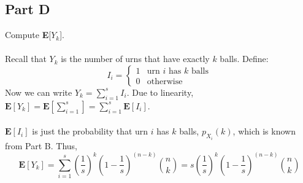\documentclass{amsart}
\begin{document}
	\subsection{Part D}
	Compute \textbf{E}[$Y_k$].\\
	\\
	Recall that $Y_k$ is the number of urns that have exactly $k$ balls. Define:\\
	\[
		I_i=
		\begin{cases}
			1 & \text{urn } i \text{ has } k \text{ balls}\\
			0 & \text{otherwise}
		\end{cases}
	\]
	Now we can write $Y_k = \sum_{i=1}^{s} I_i$. Due to linearity, $\textbf{E}[Y_k] = \textbf{E}\left[\sum_{i=1}^{s}\right] =\sum_{i=1}^{s} \textbf{E}[I_i]$.\\
	\\
	$\textbf{E}[I_i]$ is just the probability that urn $i$ has $k$ balls, $p_{X_i}(k)$, which is known from Part B. Thus,
	\[
		\textbf{E}[Y_k] = \sum_{i=1}^{s} \left(\frac{1}{s}\right)^k\left(1-\frac{1}{s}\right)^{(n-k)}\binom{n}{k} = s \left(\frac{1}{s}\right)^k\left(1-\frac{1}{s}\right)^{(n-k)}\binom{n}{k}
	\]
	\\
\end{document}
